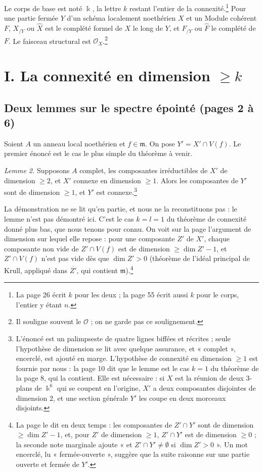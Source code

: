 \documentclass[11pt,a4paper]{article}
\begin{document}
Le corps de base est noté $\Bbbk$, la lettre $k$ restant l'entier de la
connexité.\footnote{La page 26 écrit $k$ pour les deux ; la page 55 écrit aussi $k$
pour le corps, l'entier y étant $n$.} Pour une
partie fermée $Y$ d'un schéma localement noethérien $X$ et un Module cohérent
$F$, $X_{/Y}$ ou $\widehat{X}$ est le complété formel de $X$ le long de $Y$, et
$F_{/Y}$ ou $\widehat{F}$ le complété de $F$. Le faisceau structural est
$\mathcal{O}_X$.\footnote{Il souligne souvent le $\mathcal{O}$ ; on ne garde
pas ce soulignement.}

\section*{I. La connexité en dimension $\geq k$}

\subsection*{Deux lemmes sur le spectre épointé (pages 2 à 6)}

Soient $A$ un anneau local noethérien et $f \in \mathfrak{m}$. On pose
$Y' = X' \cap V(f)$. Le premier énoncé est le cas le plus simple du
théorème à venir.

\emph{Lemme 2.} Supposons $A$ complet, les composantes irréductibles de $X'$
de dimension $\geq 2$, et $X'$ connexe en dimension $\geq 1$. Alors les
composantes de $Y'$ sont de dimension $\geq 1$, et $Y'$ est
connexe.\footnote{L'énoncé est un palimpseste de quatre lignes biffées et
récrites ; seule l'hypothèse de dimension se lit avec quelque assurance, et «
complet », encerclé, est ajouté en marge. L'hypothèse de connexité en
dimension $\geq 1$ est fournie par nous : la page 10 dit que le lemme est le
cas $k = 1$ du théorème de la page 8, qui la contient. Elle est nécessaire :
si $X$ est la réunion de deux $3$-plans de $\Bbbk^6$ qui se coupent en
l'origine, $X'$ a deux composantes disjointes de dimension $2$, et une section
générale $Y'$ les coupe en deux morceaux disjoints.}

La démonstration ne se lit qu'en partie, et nous ne la reconstituons pas : le
lemme n'est pas démontré ici. C'est le cas $k = l = 1$ du théorème de
connexité donné plus bas, que nous tenons pour connu. On voit sur la page
l'argument de dimension sur lequel elle repose : pour une composante $Z'$ de $X'$, chaque
composante non vide de $Z' \cap V(f)$ est de dimension $\geq \dim Z' - 1$, et
$Z' \cap V(f)$ n'est pas vide dès que $\dim Z' > 0$ (théorème de
l'idéal principal de Krull, appliqué dans $\overline{Z'}$, qui contient
$\mathfrak{m}$).\footnote{La page le dit en deux temps : les composantes de
$Z' \cap Y'$ sont de dimension $\geq \dim Z' - 1$, et, pour $Z'$ de
dimension $\geq 1$, $Z' \cap Y'$ est de dimension $\geq 0$ ; la seconde note
marginale ajoute « et $Z' \cap Y' \neq \emptyset$ si $\dim Z' > 0$ ». Un mot encerclé, lu «
fermée-ouverte », suggère que la suite raisonne sur une partie ouverte et
fermée de $Y'$.}
\end{document}
